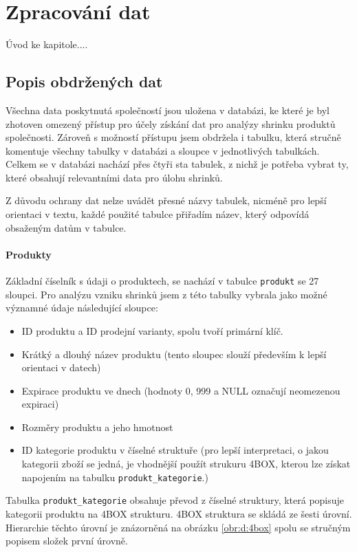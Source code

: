 \chapter{Zpracování dat}

Úvod ke kapitole.... %

\section{Popis obdržených dat}

Všechna data poskytnutá společností jsou uložena v databázi, ke které je byl zhotoven omezený přístup pro účely získání dat pro analýzy shrinku produktů společnosti. Zároveň s možností přístupu jsem obdržela i tabulku, která stručně komentuje všechny tabulky v databázi a sloupce v jednotlivých tabulkách. Celkem se v databázi nachází přes čtyři sta tabulek, z nichž je potřeba vybrat ty, které obsahují relevantními data pro úlohu shrinků.

Z důvodu ochrany dat nelze uvádět přesné názvy tabulek, nicméně pro lepší orientaci v textu, každé použité tabulce přiřadím název, který odpovídá obsaženým datům v tabulce.

\subsubsection{Produkty}

Základní číselník s údaji o produktech, se nachází v tabulce \texttt{produkt} se 27 sloupci. Pro analýzu vzniku shrinků jsem z této tabulky vybrala jako možné významné údaje následující sloupce:
\begin{itemize}
    \item ID produktu a ID prodejní varianty, spolu tvoří primární klíč. 
    \item Krátký a dlouhý název produktu (tento sloupec slouží především k lepší orientaci v datech)
    \item Expirace produktu ve dnech (hodnoty 0, 999 a NULL označují neomezenou expiraci)
    \item Rozměry produktu a jeho hmotnost
    \item ID kategorie produktu v číselné struktuře (pro lepší interpretaci, o jakou kategorii zboží se jedná, je vhodnější použít strukuru 4BOX, kterou lze získat napojením na tabulku \texttt{produkt\_kategorie}.)
\end{itemize}
Tabulka \texttt{produkt\_kategorie} obsahuje převod z číselné struktury, která popisuje kategorii produktu na 4BOX strukturu. 4BOX struktura se skládá ze šesti úrovní. Hierarchie těchto úrovní je znázorněná na obrázku \ref*{obr:d:4box} spolu se stručným popisem složek první úrovně.


